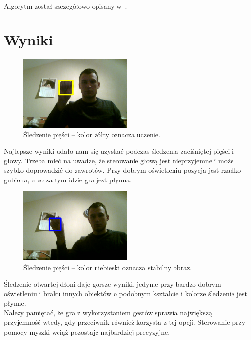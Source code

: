 \documentclass{article}
\begin{document}
Algorytm został szczegółowo opisany w~\cite{TLD-thesis}.

\section{Wyniki} \label{results}

\begin{figure}[!ht]
\centering
\includegraphics[width=0.5\textwidth]{fist-yellow.png}
\caption{Śledzenie pięści -- kolor żółty oznacza uczenie.}
\label{fig:fist-yellow}
\end{figure}

Najlepsze wyniki udało nam się uzyskać podczas śledzenia zaciśniętej pięści i głowy.
Trzeba mieć na uwadze, że sterowanie głową jest nieprzyjemne i może szybko doprowadzić do zawrotów.
Przy dobrym oświetleniu pozycja jest rzadko gubiona, a co za tym idzie gra jest płynna.

\begin{figure}[!ht]
\centering
\includegraphics[width=0.5\textwidth]{fist-blue.png}
\caption{Śledzenie pięści -- kolor niebieski oznacza stabilny obraz.}
\label{fig:fist-blue}
\end{figure}

Śledzenie otwartej dłoni daje gorsze wyniki, jedynie przy bardzo dobrym oświetleniu
i braku innych obiektów o podobnym kształcie i kolorze śledzenie jest płynne. \\

Należy pamiętać, że gra z wykorzystaniem gestów sprawia największą przyjemność wtedy,
gdy przeciwnik również korzysta z tej opcji.
Sterowanie przy pomocy myszki wciąż pozostaje najbardziej precyzyjne.
\end{document}
